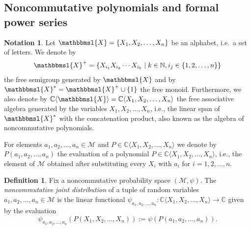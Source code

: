 \documentclass[12pt]{amsart}
\newcommand\IC{{\mathbb C}}
\newcommand\IN{{\mathbb N}}
\newcommand{\alg}[1]{\mathcal{#1}}
\newcommand{\alf}[1]{\mathbbmsl{#1}} %
\theoremstyle{definition}
\newtheorem{notation}[theorem]{Notation}
\newtheorem{definition}[theorem]{Definition}
\numberwithin{equation}{section}
\begin{document}
\subsection{Noncommutative polynomials and formal power series}
\label{ssec:nc_polynomials}
\begin{notation}
  Let $\alf{X}=\{X_1,X_2,\ldots,X_n\}$ be an alphabet, i.e.~a set of letters.
  We denote by 
  \[
    \alf{X}^+=\{X_{i_1}X_{i_2}\cdots X_{i_k}\mid k\in\IN, i_j\in
    \{1,2,\dots,n\}\}
  \]
  the free semigroup generated by $\alf{X}$ and by
  $\alf{X}^*=\alf{X}^+\cup\{1\}$ the free monoid.
  Furthermore, we also denote by $\IC\langle\alf{X}\rangle= \IC\langle
  X_1,X_2,\ldots,X_n\rangle$ the free associative algebra generated by the
  variables $X_1,X_2,\ldots,X_n$, i.e., the linear span of $\alf{X}^*$ with the
  concatenation product, also known as the algebra of noncommutative
  polynomials. 
			
  For elements $a_1,a_2,\ldots,a_n\in\alg{M}$ and
  $P\in\IC\langle X_1,X_2,\dots,X_n\rangle$ we denote by
  $P(a_1,a_2,\ldots,a_n)$ the evaluation of a polynomial
  $P\in\IC\langle X_1,X_2,\ldots,X_n\rangle$, i.e., the element of $\alg{M}$
  obtained after substituting every $X_i$ with $a_i$ for $i=1,2,\ldots,n$.
\end{notation}
\begin{definition}
  Fix a noncommutative probability space $(\alg{M},\psi)$.
  The \emph{noncommutative joint distribution} of a tuple of random variables
  $a_1,a_2,\ldots,a_n\in \alg{M}$ is the linear functional
  $\psi_{a_1,a_2,\dots,a_n}:\IC\langle X_1,X_2,\ldots,X_n\rangle\to\IC$
  given by the evaluation
  \[
    \psi_{a_1,a_2,\dots,a_n}(P(X_1,X_2,\ldots,X_n)):=\psi\left(P(a_1,a_2,\ldots,a_n)\right).
  \]
\end{definition}
\end{document}
